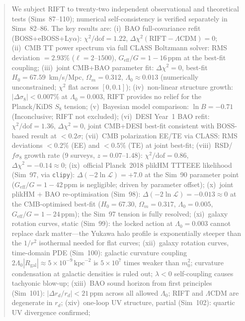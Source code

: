 \documentclass[12pt,a4paper]{article}
\begin{document}
\begin{abstract}
We subject RIFT to twenty-two independent observational and theoretical tests (Sims~87--110); numerical self-consistency is verified separately in Sims~82--86.
The key results are:
(i)~BAO full-covariance refit (BOSS+eBOSS+Ly$\alpha$):
    $\chi^2/\mathrm{dof}=1.22$, $\Delta\chi^2(\mathrm{RIFT}-\Lambda\mathrm{CDM})=0$;
(ii)~CMB TT power spectrum via full CLASS Boltzmann solver: RMS deviation $=2.93\%$
    ($\ell=2$--$1500$), $G_{\mathrm{eff}}/G = 1-16\,\mathrm{ppm}$ at the best-fit
    coupling;
(iii)~joint CMB+BAO parameter fit:
    $\Delta\chi^2=0$, best-fit $H_0=67.59$~km/s/Mpc, $\Omega_m=0.312$,
    $\Lambda_0\approx0.013$ (numerically unconstrained; $\chi^2$ flat across $[0,0.1]$);
(iv)~non-linear structure growth: $|\Delta\sigma_8|<0.007\%$ at $\Lambda_0=0.003$,
    RIFT provides no relief for the Planck/KiDS $S_8$ tension;
(v)~Bayesian model comparison: $\ln B = -0.71$ (Inconclusive; RIFT not excluded);
(vi)~DESI Year~1 BAO refit: $\chi^2/\mathrm{dof}=1.36$, $\Delta\chi^2=0$,
    joint CMB+DESI best-fit consistent with BOSS-based result at $<0.2\sigma$;
(vii)~CMB polarization EE/TE via CLASS: RMS deviations $<0.2\%$ (EE) and
    $<0.5\%$ (TE) at joint best-fit;
(viii)~RSD/$f\sigma_8$ growth rate (9 surveys, $z=0.07$--$1.48$):
    $\chi^2/\mathrm{dof}=0.86$, $\Delta\chi^2=-0.14\approx0$;
(ix)~official Planck~2018 plikHM TTTEEE likelihood (Sim~97, via \texttt{clipy}):
    $\Delta(-2\ln\mathcal{L})=+7.0$ at the Sim~90 parameter point
    ($G_\mathrm{eff}/G=1-42\,\mathrm{ppm}$ is negligible; driven by parameter offset);
(x)~joint plikHM + BAO re-optimisation (Sim~98): $\Delta(-2\ln\mathcal{L})=-0.013\approx 0$
    at the CMB-optimised best-fit ($H_0=67.30$, $\Omega_m=0.317$, $\Lambda_0=0.005$,
    $G_\mathrm{eff}/G=1-24\,\mathrm{ppm}$); the Sim~97 tension is fully resolved;
(xi)~galaxy rotation curves, static (Sim~99): the locked action at $\Lambda_0=0.003$
    cannot replace dark matter---the Yukawa halo profile is exponentially steeper
    than the $1/r^2$ isothermal needed for flat curves;
(xii)~galaxy rotation curves, time-domain PDE (Sim~100): galactic curvature coupling
    $2\Lambda_0|R_\mathrm{gal}|\approx5\times10^{-9}\,\mathrm{kpc}^{-2}$ is
    $5\times10^7$ times weaker than $m_0^2$; curvature condensation at galactic
    densities is ruled out; $\lambda<0$ self-coupling causes tachyonic blow-up;
(xiii)~BAO sound horizon from first principles (Sim~101): $|\Delta r_d/r_d|<21\,\mathrm{ppm}$
    across all allowed $\Lambda_0$; RIFT and $\Lambda$CDM are degenerate in $r_d$;
(xiv)~one-loop UV structure, partial (Sim~102): quartic UV divergence confirmed;

\end{abstract}
\end{document}
